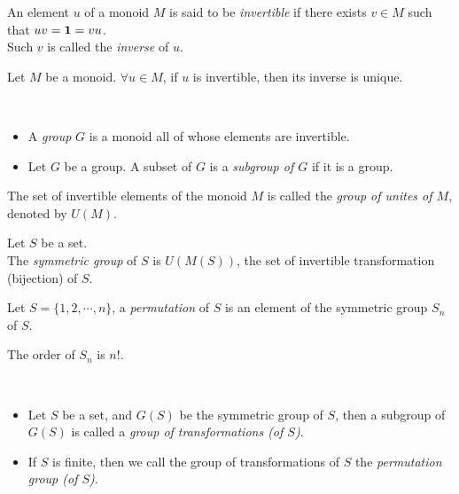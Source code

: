 \begin{definition}[Invertible] An element $u$ of a monoid $M$ is said to be \textit{invertible} if there exists $v \in M$ such that $uv=\mathbf{1}=vu$.
\\ Such $v$ is called the \textit{inverse} of $u$.
\end{definition}

\begin{remark} Let $M$ be a monoid.
$\forall u \in M$, if $u$ is invertible, then its inverse is unique.
\end{remark}

\begin{definition} ~
\begin{itemize}
    \item A \textit{group} $G$ is a monoid all of whose elements are invertible.
    \item Let $G$ be a group. A subset of $G$ is a \textit{subgroup of $G$} if it is a group.
\end{itemize}
\end{definition}

\begin{definition}
The set of invertible elements of the monoid $M$ is called the \textit{group of unites of $M$}, denoted by $U(M)$.
\end{definition}

\begin{definition} Let $S$ be a set.
\\ The \textit{symmetric group} of $S$ is $U(M(S))$, the set of invertible transformation (bijection) of $S$.
\end{definition}

\begin{definition}[Permutation]
Let $S = \{ 1,2,\cdots ,n \}$, a \textit{permutation} of $S$ is an element of the symmetric group $S_n$ of $S$.
\end{definition}

\begin{prop}
The order of $S_n$ is $n!$.
\end{prop}

\begin{definition} ~
    \begin{itemize}
        \item Let $S$ be a set, and $G(S)$ be the symmetric group of $S$, then a subgroup of $G(S)$ is called a \textit{group of transformations (of $S$)}.
        \item If $S$ is finite, then we call the group of transformations of $S$ the \textit{permutation group (of $S$)}.
    \end{itemize}
\end{definition}


